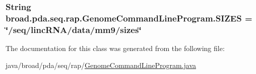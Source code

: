 \hypertarget{classbroad_1_1pda_1_1seq_1_1rap_1_1_genome_command_line_program_a977f4bba37c07644bd7fe0f02415f4b9}{
\subsubsection[{S\+I\+Z\+E\+S}]{\setlength{\rightskip}{0pt plus 5cm}String broad.\+pda.\+seq.\+rap.\+Genome\+Command\+Line\+Program.\+S\+I\+Z\+E\+S = \char`\"{}/seq/linc\+R\+N\+A/data/mm9/sizes\char`\"{}}}\label{classbroad_1_1pda_1_1seq_1_1rap_1_1_genome_command_line_program_a977f4bba37c07644bd7fe0f02415f4b9}


The documentation for this class was generated from the following file\+:\begin{DoxyCompactItemize}
\item 
java/broad/pda/seq/rap/\hyperlink{_genome_command_line_program_8java}{Genome\+Command\+Line\+Program.\+java}\end{DoxyCompactItemize}
